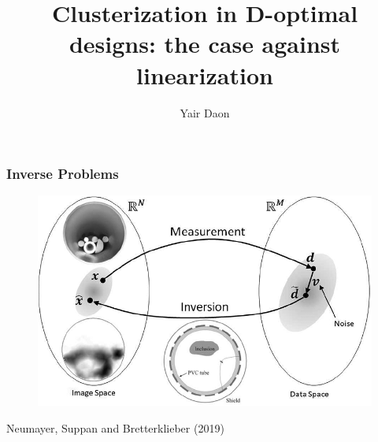 \documentclass{beamer}
\title{Clusterization in D-optimal designs: the case against linearization}
\author{Yair Daon}
\institute{Azrieli Faculty of Medicine, Bar-Ilan University}
\date{}
\begin{document}

\begin{frame}
  \titlepage
\end{frame}


\begin{frame}
  \frametitle{Inverse Problems}

  \begin{figure}
    \centering
    \includegraphics[width=\textwidth]{figs/inverse_problem.png}
  \end{figure}

  {\hfill \tiny Neumayer, Suppan and Bretterklieber (2019)}
\end{frame}
\end{document}
